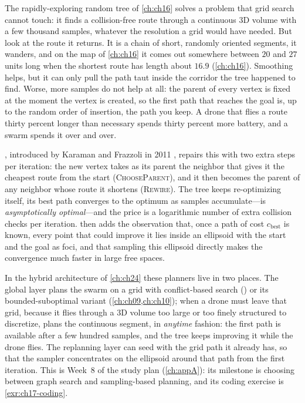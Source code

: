 The rapidly-exploring random tree of \cref{ch:ch16} solves a problem that
grid search cannot touch: it finds a collision-free route through a
continuous 3D volume with a few thousand samples, whatever the resolution a
grid would have needed. But look at the route it returns. It is a chain of
short, randomly oriented segments, it wanders, and on the map of
\cref{ch:ch16} it comes out somewhere between $20$ and $27$ units long when
the shortest route has length about $16.9$ (\cref{ch:ch16}). Smoothing helps, but it can only pull
the path taut inside the corridor the tree happened to find. Worse, more
samples do not help at all: the parent of every vertex is fixed at the moment
the vertex is created, so the first path that reaches the goal is, up to the
random order of insertion, the path you keep. A drone that flies a route
thirty percent longer than necessary spends thirty percent more battery,
and a swarm spends it over and over.

\rrtstar, introduced by Karaman and Frazzoli in 2011
\cite{karaman2011sampling}, repairs this with two extra steps per
iteration: the new vertex takes as its parent the neighbor that gives it
the cheapest route from the start (\textsc{ChooseParent}), and it then
becomes the parent of any neighbor whose route it shortens
(\textsc{Rewire}). The tree keeps re-optimizing itself, its best path
converges to the optimum as samples accumulate---\rrtstar is
\emph{asymptotically optimal}---and the price is a logarithmic number of
extra collision checks per iteration. \irrtstar
\cite{gammell2014informed} then adds the observation that, once a path of
cost $c_{\mathrm{best}}$ is known, every point that could improve it lies
inside an ellipsoid with the start and the goal as foci, and that sampling
this ellipsoid directly makes the convergence much faster in large free
spaces.

In the hybrid architecture of \cref{ch:ch24} these planners live in two
places. The global layer plans the swarm on a grid with conflict-based search
(\cbs) or its bounded-suboptimal variant \ecbs (\cref{ch:ch09,ch:ch10}); when a drone must leave that grid, because it
flies through a 3D volume too large or too finely structured to discretize,
\rrtstar plans the continuous segment, in \emph{anytime} fashion: the first
path is available after a few hundred samples, and the tree keeps improving
it while the drone flies. The replanning
layer can seed \irrtstar with the grid path it already has, so that the
sampler concentrates on the ellipsoid around that path from the first
iteration. This is Week~8 of the study plan (\cref{ch:appA}): its milestone is choosing
between graph search and sampling-based planning, and its coding exercise
is \cref{exr:ch17-coding}.

